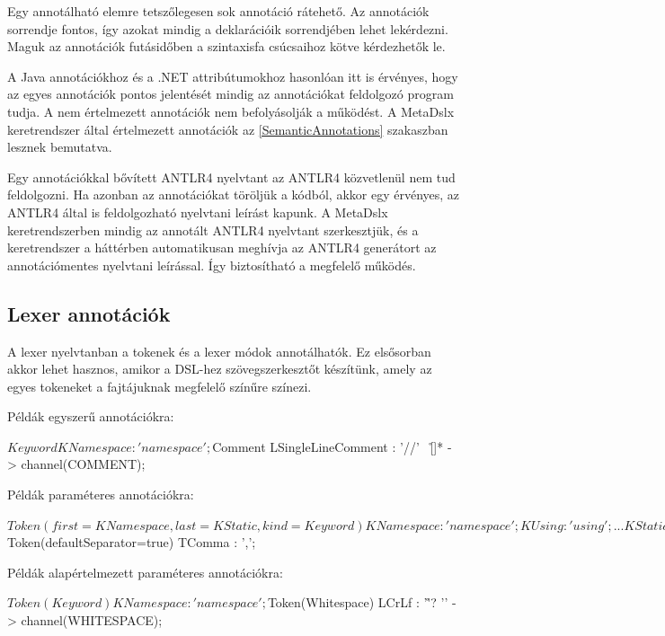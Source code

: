 \documentclass[12pt, a4paper]{report}
\begin{document}
Egy annotálható elemre tetszőlegesen sok annotáció rátehető. Az annotációk sorrendje fontos, így azokat mindig a deklarációik sorrendjében lehet lekérdezni. Maguk az annotációk futásidőben a szintaxisfa csúcsaihoz kötve kérdezhetők le.

A Java annotációkhoz és a .NET attribútumokhoz hasonlóan itt is érvényes, hogy az egyes annotációk pontos jelentését mindig az annotációkat feldolgozó program tudja. A nem értelmezett annotációk nem befolyásolják a működést. A MetaDslx keretrendszer által értelmezett annotációk az \ref{SemanticAnnotations} szakaszban lesznek bemutatva.

Egy annotációkkal bővített ANTLR4 nyelvtant az ANTLR4 közvetlenül nem tud feldolgozni. Ha azonban az annotációkat töröljük a kódból, akkor egy érvényes, az ANTLR4 által is feldolgozható nyelvtani leírást kapunk. A MetaDslx keretrendszerben mindig az annotált ANTLR4 nyelvtant szerkesztjük, és a keretrendszer a háttérben automatikusan meghívja az ANTLR4 generátort az annotációmentes nyelvtani leírással. Így biztosítható a megfelelő működés.

\subsection{Lexer annotációk}

A lexer nyelvtanban a tokenek és a lexer módok annotálhatók. Ez elsősorban akkor lehet hasznos, amikor a DSL-hez szövegszerkesztőt készítünk, amely az egyes tokeneket a fajtájuknak megfelelő színűre színezi.

Példák egyszerű annotációkra:
\begin{antlr4code}
$Keyword
KNamespace : 'namespace';

$Comment
LSingleLineComment : '//' ~[\r\n]* -> channel(COMMENT);
\end{antlr4code}

Példák paraméteres annotációkra:
\begin{antlr4code}
$Token(first=KNamespace,last=KStatic,kind=Keyword)
KNamespace : 'namespace';
KUsing : 'using';
...
KStatic : 'static';

$Token(defaultSeparator=true)
TComma : ',';
\end{antlr4code}

Példák alapértelmezett paraméteres annotációkra:
\begin{antlr4code}
$Token(Keyword)
KNamespace : 'namespace';

$Token(Whitespace)
LCrLf : '\r'? '\n' -> channel(WHITESPACE);
\end{antlr4code}
\end{document}
